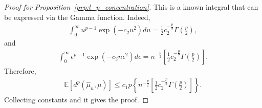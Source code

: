 \begin{proof}[Proof for Proposition~\ref{prp:l_p_concentration}]
   This is a known integral that can be expressed via the Gamma function.
   Indeed,
   \begin{align*}
       \int^\infty_0 u^{p-1}\exp(-c_2 u^2)du = \frac{1}{2}c_2^{-\frac{p}{2}}\Gamma\left(\frac{p}{2}\right),
   \end{align*}
   and
   \begin{align*}
       \int^\infty_0 \epsilon^{p-1}\exp(-c_2 n \epsilon^2) d\epsilon = n^{-\frac{p}{2}}\left[\frac{1}{2}c_2^{-\frac{p}{2}}\Gamma\left(\frac{p}{2}\right)\right].
   \end{align*}
   Therefore,
   \begin{align*}
       \mathbb{E}\left[d^p(\hat{\mu}_n, \mu)\right] \leq c_1 p \left\{n^{-\frac{p}{2}}\left[\frac{1}{2}c_2^{-\frac{p}{2}}\Gamma\left(\frac{p}{2}\right)\right]\right\}.
   \end{align*}
   Collecting constants and it gives the proof.
\end{proof}

